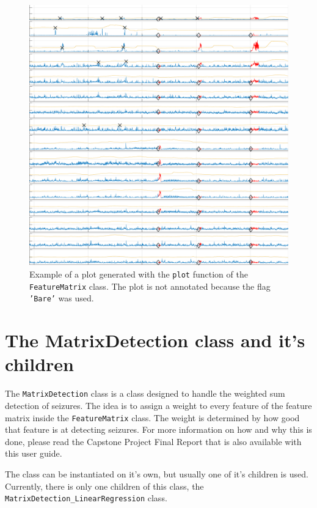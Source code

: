 \documentclass[usletter, 11pt]{extarticle}
\begin{document}
\begin{figure}[!h]
	\centering
	\includegraphics[width = \textwidth]{img/example_matrix_plot}
	\caption{Example of a plot generated with the \texttt{plot} function of the \texttt{FeatureMatrix} class. The plot is not annotated because the flag \texttt{'Bare'} was used.}
	\label{fig:plot_matrix}
\end{figure}

\clearpage
\section{The MatrixDetection class and it's children}

The \verb|MatrixDetection| class is a class designed to handle the weighted sum detection of seizures. The idea is to assign a weight to every feature of the feature matrix inside the \verb|FeatureMatrix| class. The weight is determined by how good that feature is at detecting seizures. For more information on how and why this is done, please read the Capstone Project Final Report that is also available with this user guide. 

The class can be instantiated on it's own, but usually one of it's children is used. Currently, there is only one children of this class, the \verb|MatrixDetection_LinearRegression| class.
\end{document}
